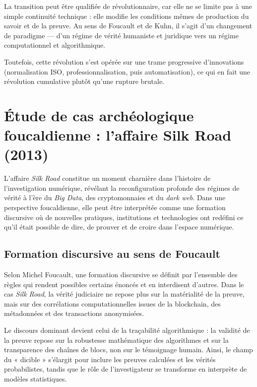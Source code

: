 \documentclass[12pt, a4em]{article}
\begin{document}
	La transition peut être qualifiée de révolutionnaire, car elle ne se limite pas à une simple continuité technique : elle modifie les conditions mêmes de production du savoir et de la preuve. Au sens de Foucault et de Kuhn, il s’agit d’un changement de paradigme — d’un régime de vérité humaniste et juridique vers un régime computationnel et algorithmique.
	
	Toutefois, cette révolution s’est opérée sur une trame progressive d’innovations (normalisation ISO, professionnalisation, puis automatisation), ce qui en fait une révolution cumulative plutôt qu’une rupture brutale.
	
	
	\section{Étude de cas archéologique foucaldienne : l’affaire Silk Road (2013)}
	
	L’affaire \textit{Silk Road} constitue un moment charnière dans l’histoire de l’investigation numérique, révélant la reconfiguration profonde des régimes de vérité à l’ère du \textit{Big Data}, des cryptomonnaies et du \textit{dark web}.
	Dans une perspective foucaldienne, elle peut être interprétée comme une formation discursive où de nouvelles pratiques, institutions et technologies ont redéfini ce qu’il était possible de dire, de prouver et de croire dans l’espace numérique.
	
	\subsection{ Formation discursive au sens de Foucault}
	
	Selon Michel Foucault, une formation discursive se définit par l’ensemble des règles qui rendent possibles certains énoncés et en interdisent d’autres.
	Dans le cas \textit{Silk Road}, la vérité judiciaire ne repose plus sur la matérialité de la preuve, mais sur des corrélations computationnelles issues de la blockchain, des métadonnées et des transactions anonymisées.
	
	Le discours dominant devient celui de la traçabilité algorithmique : la validité de la preuve repose sur la robustesse mathématique des algorithmes et sur la transparence des chaînes de blocs, non sur le témoignage humain.
	Ainsi, le champ du « dicible » s’élargit pour inclure les preuves calculées et les vérités probabilistes, tandis que le rôle de l’investigateur se transforme en interprète de modèles statistiques.
	
\end{document}
